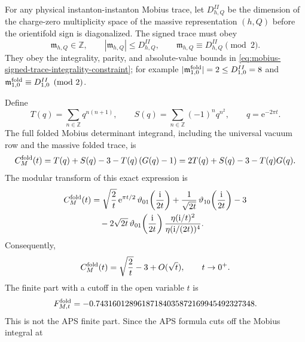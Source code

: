 \documentclass[11pt]{article}
\newcommand{\Z}{\mathbb{Z}}
\newcommand{\ii}{\mathrm{i}}
\newcommand{\e}{\mathrm{e}}
\newcommand{\vart}{\vartheta}
\newcommand{\etaD}{\eta}
\begin{document}
For any physical instanton-instanton Mobius trace, let \(D_{h,Q}^{II}\) be the dimension of the
charge-zero multiplicity space of the massive representation \((h,Q)\) before the orientifold
sign is diagonalized. The signed trace must obey
\begin{equation}
  \mathfrak m_{h,Q}\in\Z,
  \qquad
  |\mathfrak m_{h,Q}|\le D_{h,Q}^{II},
  \qquad
  \mathfrak m_{h,Q}\equiv D_{h,Q}^{II}\pmod 2 .
  \label{eq:mobius-signed-trace-integrality-constraint}
\end{equation}
They obey the integrality, parity, and absolute-value bounds in
\eqref{eq:mobius-signed-trace-integrality-constraint}; for example
\(|\mathfrak m_{1,0}^{\rm fold}|=2\le D_{1,0}^{II}=8\) and
\(\mathfrak m_{1,0}^{\rm fold}\equiv D_{1,0}^{II}\pmod2\).

Define
\begin{equation}
  T(q)=\sum_{n\in\Z}q^{n(n+1)},
  \qquad
  S(q)=\sum_{n\in\Z}(-1)^nq^{n^2},
  \qquad
  q=\e^{-2\pi t}.
  \label{eq:folded-T-and-S}
\end{equation}
The full folded Mobius determinant integrand, including the universal vacuum row and the
massive folded trace, is
\begin{equation}
  C_M^{\rm fold}(t)
  =
  T(q)+S(q)-3
  -
  T(q)\left(G(q)-1\right)
  =
  2T(q)+S(q)-3-T(q)G(q).
  \label{eq:folded-total-mobius-integrand}
\end{equation}
The modular transform of this exact expression is
\begin{align}
  C_M^{\rm fold}(t)
  &=
  \sqrt{\frac{2}{t}}\,
  \e^{\pi t/2}\,
  \vart_{01}\!\left(\frac{\ii}{2t}\right)
  +
  \frac{1}{\sqrt{2t}}\,
  \vart_{10}\!\left(\frac{\ii}{2t}\right)
  -3
  \nonumber\\
  &\quad
  -2\sqrt{2t}\,
  \vart_{01}\!\left(\frac{\ii}{2t}\right)
  \frac{\etaD(\ii/t)^2}{\etaD(\ii/(2t))^4}.
  \label{eq:folded-total-mobius-modular-transform}
\end{align}
Consequently,
\begin{equation}
  C_M^{\rm fold}(t)
  =
  \sqrt{\frac{2}{t}}-3+O(\sqrt t),
  \qquad t\to0^+.
  \label{eq:folded-small-t-expansion}
\end{equation}
The finite part with a cutoff in the open variable \(t\) is
\begin{equation}
  F_{M,t}^{\rm fold}
  =
  -0.74316012896187184035872169945492327348 .
  \label{eq:folded-t-cutoff-finite-part}
\end{equation}
This is not the APS finite part.  Since the APS formula cuts off the Mobius integral at
\end{document}
